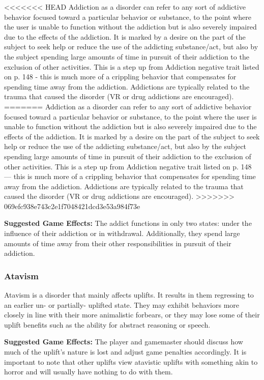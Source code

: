 <<<<<<< HEAD
Addiction as a disorder can refer to any sort of addictive behavior focused toward a particular behavior or substance, to the point where the user is unable to function without the addiction but is also severely impaired due to the effects of the addiction. It is marked by a desire on the part of the subject to seek help or reduce the use of the addicting substance/act, but also by the subject spending large amounts of time in pursuit of their addiction to the exclusion of other activities. This is a step up from Addiction negative trait listed on p. 148 - this is much more of a crippling behavior that compensates for spending time away from the addiction. Addictions are typically related to the trauma that caused the disorder (VR or drug addictions are encouraged).
=======
Addiction as a disorder can refer to any sort of addictive behavior focused toward a particular behavior or substance, to the point where the user is unable to function without the addiction but is also severely impaired due to the effects of the addiction. It is marked by a desire on the part of the subject to seek help or reduce the use of the addicting substance/act, but also by the subject spending large amounts of time in pursuit of their addiction to the exclusion of other activities. This is a step up from Addiction negative trait listed on p. 148 --- this is much more of a crippling behavior that compensates for spending time away from the addiction. Addictions are typically related to the trauma that caused the disorder (VR or drug addictions are encouraged).
>>>>>>> 069efc938e743c2e1f7048421dcd3e53a984f73e

\textbf{Suggested Game Effects:} The addict functions in only two states: under the influence of their addiction or in withdrawal. Additionally, they spend large amounts of time away from their other responsibilities in pursuit of their addiction.

\subsubsection{Atavism}

Atavism is a disorder that mainly affects uplifts. It results in them regressing to an earlier un- or partially- uplifted state. They may exhibit behaviors more closely in line with their more animalistic forbears, or they may lose some of their uplift benefits such as the ability for abstract reasoning or speech.

\textbf{Suggested Game Effects:} The player and gamemaster should discuss how much of the uplift’s nature is lost and adjust game penalties accordingly. It is important to note that other uplifts view atavistic uplifts with something akin to horror and will usually have nothing to do with them.


